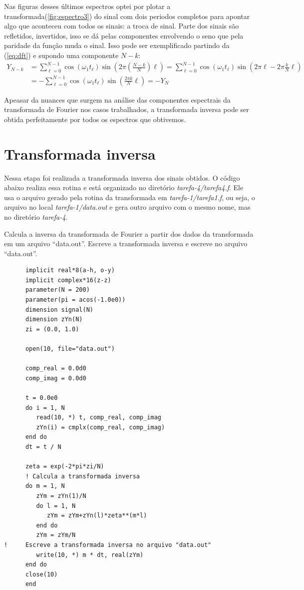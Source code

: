 \documentclass[a4paper, 11pt]{article}
\begin{document}
Nas figuras desses últimos espectros optei por plotar a transformada(\ref{fig:espectro3}) do sinal
com dois periodos completos para apontar algo que aconteceu com todos os sinais: a troca de sinal.
Parte dos sinais são refletidos, invertidos, isso se dá pelas componentes envolvendo o seno que
pela paridade da função muda o sinal. Isso pode ser exemplificado
partindo da (\ref{eq:dft}) e supondo uma componente $N-k$:
\begin{align*}
  Y_{N-k} &= \sum_{\ell = 0}^{N-1} \cos \left( \omega_1 t_\ell \right) \sin \left( 2 \pi \left( \frac{N-k}{N}
            \right) \ell \right) 
          = \sum_{\ell = 0}^{N-1} \cos(\omega_1 t_\ell) \sin \left( 2 \pi \ell  - 2 \pi \frac{k}{N} \ell \right) \\
          &= - \sum_{\ell=0}^{N-1} \cos (\omega_1 t_\ell) \sin \left( \frac{2\pi k}{N}\ell  \right) =  - Y_N
\end{align*}


Apeasar da nuances que surgem na análise das componentes espectrais da transformada de Fourier nos
casos trabalhados, a transformada inversa pode ser obtida perfeitamente por todos os espectros que
obtivemos.


\clearpage
\section{Transformada inversa}


Nessa etapa foi realizada a transformada inversa dos sinais obtidos. O código abaixo
realiza essa rotina e está organizado no diretório \emph{tarefa-4/tarefa4.f}. Ele usa o arquivo
gerado pela rotina da transformada em \emph{tarefa-1/tarefa1.f}, ou seja, o arquivo no local
\emph{tarefa-1/data.out} e gera outro arquivo com o mesmo nome, mas no diretório \emph{tarefa-4}. 


Calcula a inversa da transformada de Fourier a partir dos dados da transformada em um
arquivo ``data.out''. Escreve a transformada inversa e escreve no arquivo ``data.out''.
\begin{verbatim}
      implicit real*8(a-h, o-y)
      implicit complex*16(z-z)
      parameter(N = 200)
      parameter(pi = acos(-1.0e0))
      dimension signal(N)
      dimension zYn(N)
      zi = (0.0, 1.0)

      open(10, file="data.out")

      comp_real = 0.0d0
      comp_imag = 0.0d0

      t = 0.0e0
      do i = 1, N
         read(10, *) t, comp_real, comp_imag
         zYn(i) = cmplx(comp_real, comp_imag)
      end do
      dt = t / N

      zeta = exp(-2*pi*zi/N)
      ! Calcula a transformada inversa
      do m = 1, N
         zYm = zYn(1)/N
         do l = 1, N
            zYm = zYm+zYn(l)*zeta**(m*l)
         end do
         zYm = zYm/N
!     Escreve a transformada inversa no arquivo "data.out"
         write(10, *) m * dt, real(zYm)
      end do
      close(10)
      end
\end{verbatim}
\end{document}

